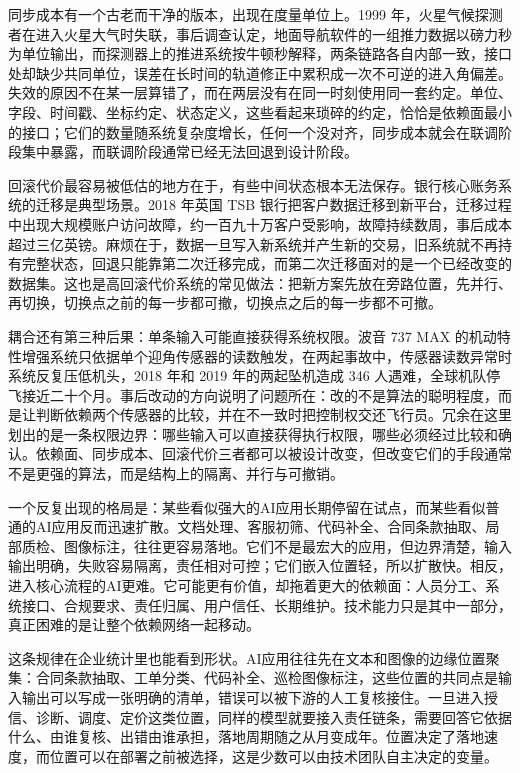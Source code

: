 同步成本有一个古老而干净的版本，出现在度量单位上。1999 年，火星气候探测者在进入火星大气时失联，事后调查认定，地面导航软件的一组推力数据以磅力秒为单位输出，而探测器上的推进系统按牛顿秒解释，两条链路各自内部一致，接口处却缺少共同单位，误差在长时间的轨道修正中累积成一次不可逆的进入角偏差\cite{nasa1999mishap}。失效的原因不在某一层算错了，而在两层没有在同一时刻使用同一套约定。单位、字段、时间戳、坐标约定、状态定义，这些看起来琐碎的约定，恰恰是依赖面最小的接口；它们的数量随系统复杂度增长，任何一个没对齐，同步成本就会在联调阶段集中暴露，而联调阶段通常已经无法回退到设计阶段。

回滚代价最容易被低估的地方在于，有些中间状态根本无法保存。银行核心账务系统的迁移是典型场景。2018 年英国 TSB 银行把客户数据迁移到新平台，迁移过程中出现大规模账户访问故障，约一百九十万客户受影响，故障持续数周，事后成本超过三亿英镑\cite{tsb2019migration}。麻烦在于，数据一旦写入新系统并产生新的交易，旧系统就不再持有完整状态，回退只能靠第二次迁移完成，而第二次迁移面对的是一个已经改变的数据集。这也是高回滚代价系统的常见做法：把新方案先放在旁路位置，先并行、再切换，切换点之前的每一步都可撤，切换点之后的每一步都不可撤。

耦合还有第三种后果：单条输入可能直接获得系统权限。波音 737 MAX 的机动特性增强系统只依据单个迎角传感器的读数触发，在两起事故中，传感器读数异常时系统反复压低机头，2018 年和 2019 年的两起坠机造成 346 人遇难，全球机队停飞接近二十个月\cite{jatr2019boeing}。事后改动的方向说明了问题所在：改的不是算法的聪明程度，而是让判断依赖两个传感器的比较，并在不一致时把控制权交还飞行员。冗余在这里划出的是一条权限边界：哪些输入可以直接获得执行权限，哪些必须经过比较和确认。依赖面、同步成本、回滚代价三者都可以被设计改变，但改变它们的手段通常不是更强的算法，而是结构上的隔离、并行与可撤销。


一个反复出现的格局是：某些看似强大的AI应用长期停留在试点，而某些看似普通的AI应用反而迅速扩散。文档处理、客服初筛、代码补全、合同条款抽取、局部质检、图像标注，往往更容易落地。它们不是最宏大的应用，但边界清楚，输入输出明确，失败容易隔离，责任相对可控；它们嵌入位置轻，所以扩散快。相反，进入核心流程的AI更难。它可能更有价值，却拖着更大的依赖面：人员分工、系统接口、合规要求、责任归属、用户信任、长期维护。技术能力只是其中一部分，真正困难的是让整个依赖网络一起移动。

这条规律在企业统计里也能看到形状。AI应用往往先在文本和图像的边缘位置聚集：合同条款抽取、工单分类、代码补全、巡检图像标注，这些位置的共同点是输入输出可以写成一张明确的清单，错误可以被下游的人工复核接住。一旦进入授信、诊断、调度、定价这类位置，同样的模型就要接入责任链条，需要回答它依据什么、由谁复核、出错由谁承担，落地周期随之从月变成年。位置决定了落地速度，而位置可以在部署之前被选择，这是少数可以由技术团队自主决定的变量。

